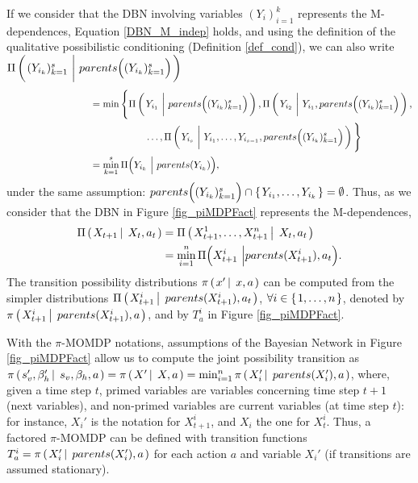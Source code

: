 If we consider that the DBN involving variables $(Y_i)_{i=1}^k$ 
represents the M-dependences, 
Equation \ref{DBN_M_indep} holds, 
and using the definition 
of the qualitative possibilistic conditioning 
(Definition \ref{def_cond}),
we can also write \\
$\Pi \left( \left.  (Y_{i_k})_{k=1}^s \ \bigg\vert \  parents \Big( (Y_{i_k})_{k=1}^s \Big)   \right. \right)$
\begin{align*}
\hspace{3cm} &= \min \Bigg\{ \Pi \paren{ Y_{i_1} \ \bigg\vert \  parents \Big( (Y_{i_k})_{k=1}^s \Big)  }, \Pi \paren{ Y_{i_2} \ \bigg\vert \  Y_{i_1}, parents \Big( (Y_{i_k})_{k=1}^s \Big)  }, \\
&\hspace{2cm} \ldots, \Pi \paren{ Y_{i_s} \ \bigg\vert \ Y_{i_1}, \ldots, Y_{i_{s-1}},  parents \Big( (Y_{i_k})_{k=1}^s \Big)  } \Bigg\}  \\
&= \min_{k=1}^s \Pi \Big( Y_{i_k} \ \Big\vert \ parents(Y_{i_k})   \Big),
\end{align*}
under the same assumption: $parents \Big( (Y_{i_k})_{k=1}^s \Big) \cap \left\{ \left. Y_{i_1},\ldots,Y_{i_k} \right. \right\} = \emptyset$. 
Thus, as we consider that 
the DBN in Figure \ref{fig_piMDPFact}
represents the M-dependences,
\begin{align*}
\Pi \left( \left.  X_{t+1} \, \right| \left. \, X_t, a_t  \right. \right) &= \Pi \left( \left.  X^1_{t+1}, \ldots, X^n_{t+1} \, \right| \left. \, X_t, a_t  \right. \right)\\
&= \min_{i=1}^{n} \Pi \Big( X^i_{t+1} \ \Big\vert parents(X^i_{t+1}), a_t \Big). 
\end{align*}
The transition possibility distributions $\pi \left( \left. x' \, \right| \left. \, x,a \right. \right)$ 
can be computed from the simpler distributions 
$\Pi \left( \left.  X^i_{t+1} \, \right| \left. \, parents(X^i_{t+1}), a_t   \right. \right)$, $\forall i \in \left\{ \left. 1,\ldots,n \right. \right\}$,
denoted by $\pi \left( \left.  X^i_{t+1} \, \right| \left. \, parents(X^i_{t+1}), a  \right. \right)$,
and by $T^i_a$ in Figure \ref{fig_piMDPFact}.

With the $\pi$-MOMDP notations, assumptions of the Bayesian Network
in Figure \ref{fig_piMDPFact}
allow us to compute the joint possibility transition as 
$\pi \left( \left. s_v',\beta_h' \, \right| \left. \, s_v,\beta_h,a \right. \right) = \pi \left( \left.  X' \, \right| \left. \, X,a  \right. \right) = \min_{i=1}^{n} \pi \left( \left.  X_i' \, \right| \left. \, parents(X_i'),a \right. \right)$,
where, given a time step $t$, 
primed variables are variables concerning time step $t+1$
(next variables), and non-primed variables are current variables 
(at time step $t$): for instance, 
$X_i'$ is the notation for $X^i_{t+1}$,
and $X_i$ the one for $X_t^i$.
Thus, a factored $\pi$-MOMDP can be defined 
with transition functions $T^i_a= \pi \left( \left. X_i' \, \right| \left. \, parents(X_i'),a  \right. \right)$ 
for each action $a$ and variable $X_i'$
(if transitions are assumed stationary).

